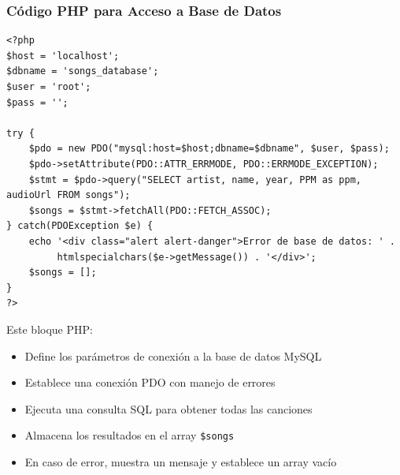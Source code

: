 \documentclass[a4paper,12pt]{article}
\begin{document}
\subsubsection{Código PHP para Acceso a Base de Datos}
\begin{verbatim}
<?php
$host = 'localhost';
$dbname = 'songs_database';
$user = 'root';
$pass = '';

try {
    $pdo = new PDO("mysql:host=$host;dbname=$dbname", $user, $pass);
    $pdo->setAttribute(PDO::ATTR_ERRMODE, PDO::ERRMODE_EXCEPTION);
    $stmt = $pdo->query("SELECT artist, name, year, PPM as ppm, audioUrl FROM songs");
    $songs = $stmt->fetchAll(PDO::FETCH_ASSOC);
} catch(PDOException $e) {
    echo '<div class="alert alert-danger">Error de base de datos: ' . 
         htmlspecialchars($e->getMessage()) . '</div>';
    $songs = [];
}
?>
\end{verbatim}
Este bloque PHP:
\begin{itemize}
    \item Define los parámetros de conexión a la base de datos MySQL
    \item Establece una conexión PDO con manejo de errores
    \item Ejecuta una consulta SQL para obtener todas las canciones
    \item Almacena los resultados en el array \texttt{\$songs}
    \item En caso de error, muestra un mensaje y establece un array vacío
\end{itemize}
\end{document}

